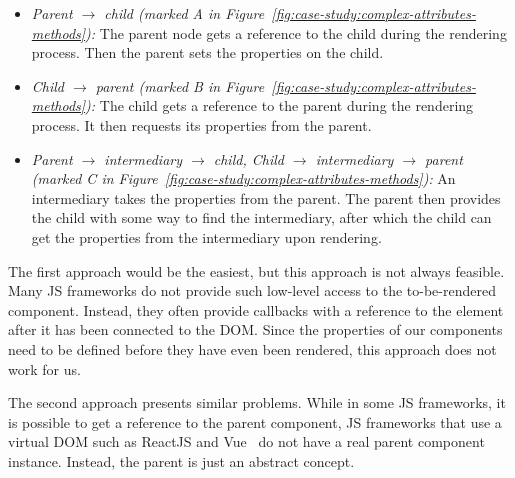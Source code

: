{  \begin{itemize}
    \item \emph{Parent \(\rightarrow\) child (marked A in Figure~\ref{fig:case-study:complex-attributes-methods}):} The parent node gets a reference to the child during the rendering process. Then the parent sets the properties on the child.
    \item \emph{Child \(\rightarrow\) parent (marked B in Figure~\ref{fig:case-study:complex-attributes-methods}):} The child gets a reference to the parent during the rendering process. It then requests its properties from the parent.
    \item \emph{Parent \(\rightarrow\) intermediary \(\rightarrow\) child, Child \(\rightarrow\) intermediary \(\rightarrow\) parent (marked C in Figure~\ref{fig:case-study:complex-attributes-methods}):} An intermediary takes the properties from the parent. The parent then provides the child with some way to find the intermediary, after which the child can get the properties from the intermediary upon rendering.
  \end{itemize}

  The first approach would be the easiest, but this approach is not always feasible. Many JS frameworks do not provide such low-level access to the to-be-rendered component. Instead, they often provide callbacks with a reference to the element after it has been connected to the DOM\@. Since the properties of our components need to be defined before they have even been rendered, this approach does not work for us.

  The second approach presents similar problems. While in some JS frameworks, it is possible to get a reference to the parent component, JS frameworks that use a virtual DOM such as ReactJS and Vue~ do not have a real parent component instance. Instead, the parent is just an abstract concept.

}
